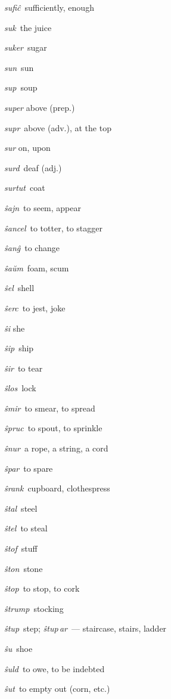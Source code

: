\begin{landscape}
\begin{multicols}{5}
\begin{outdent}{1em}
\emph{sufiĉ\,} sufficiently, enough

\emph{suk\,} the juice

\emph{suker\,} sugar

\emph{sun\,} sun

\emph{sup\,} soup

\emph{super} above (prep.)

\emph{supr\,} above (adv.), at the top

\emph{sur} on, upon

\emph{surd\,} deaf (adj.)

\emph{surtut\,} coat
\end{outdent}

%
\columnbreak


\begin{outdent}{1em}
\emph{ŝajn\,} to seem, appear

\emph{ŝancel\,} to totter, to stagger

\emph{ŝanĝ\,} to change

\emph{ŝaŭm\,} foam, scum

\emph{ŝel\,} shell

\emph{ŝerc\,} to jest, joke

\emph{ŝi} she

\emph{ŝip\,} ship

\emph{ŝir\,} to tear

\emph{ŝlos\,} lock

\emph{ŝmir\,} to smear, to spread

\emph{ŝpruc\,} to spout, to sprinkle

\emph{ŝnur\,} a rope, a string, a cord

\emph{ŝpar\,} to spare

\emph{ŝrank\,} cupboard, clothespress

\emph{ŝtal\,} steel

\emph{ŝtel\,} to steal

\emph{ŝtof\,} stuff

\emph{ŝton\,} stone

\emph{ŝtop\,} to stop, to cork

\emph{ŝtrump\,} stocking

\emph{ŝtup\,} step; \emph{ŝtup\,ar\,} — staircase, stairs, ladder

\emph{ŝu\,} shoe

\emph{ŝuld\,} to owe, to be indebted

\emph{ŝut\,} to empty out (corn, etc.)


\end{outdent}
\end{multicols}
\end{landscape}

